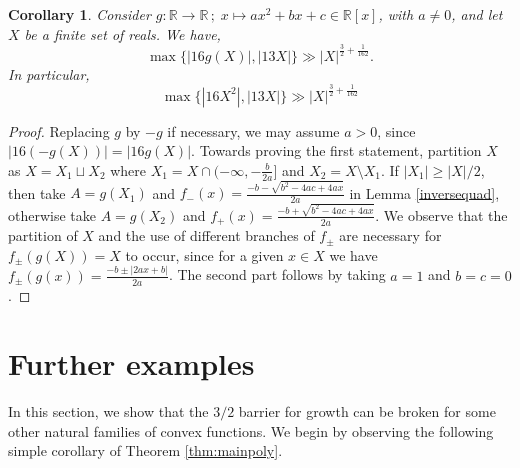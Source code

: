\documentclass[11pt]{amsart}
\newcommand{\R}{\mathbb{R}}
\newtheorem{corollary}[theorem]{Corollary}
\begin{document}
\begin{corollary}\label{cor:quadpoly}
    Consider $g:\R\rightarrow\R\,;\; x\mapsto ax^2+bx+c\in\R[x]$, with $a\neq0$, and let $X$ be a finite set of reals. We have,
    \begin{equation}\label{quadraticpoly}       
    \max \{|16g(X)|, |13X| \} \gg |X|^{\frac{3}{2} +\frac{1}{162}}.
    \end{equation}
    In particular,
    \begin{equation*}
        \max\{|16X^2|,|13X|\}\gg|X|^{\frac{3}{2}+\frac{1}{162}}
    \end{equation*}
\end{corollary}
\begin{proof}
    Replacing $g$ by $-g$ if necessary, we may assume $a>0$, since $|16(-g(X))|=|16g(X)|$. Towards proving the first statement, partition $X$ as $X=X_1\sqcup X_2$ where $X_1=X\cap(-\infty,-\frac{b}{2a}\big]$ and $X_2=X\setminus X_1$. If $|X_1|\ge|X|/2$, then take $A=g(X_1)$ and $f_-(x)=\frac{-b-\sqrt{b^2-4ac+4ax}}{2a}$ in Lemma \ref{inversequad}, otherwise take $A=g(X_2)$ and $f_+(x)=\frac{-b+\sqrt{b^2-4ac+4ax}}{2a}$. We observe that the partition of $X$ and the use of different branches of $f_\pm$ are necessary for $f_\pm(g(X))=X$ to occur, since for a given $x\in X$ we have $f_\pm(g(x))=\frac{-b\pm|2ax+b|}{2a}$. The second part follows by taking $a=1$ and $b=c=0$.
\end{proof}

\section{Further examples}

In this section, we show that the $3/2$ barrier for growth can be broken for some other natural families of convex functions. We begin by observing the following simple corollary of Theorem \ref{thm:mainpoly}.
\end{document}
